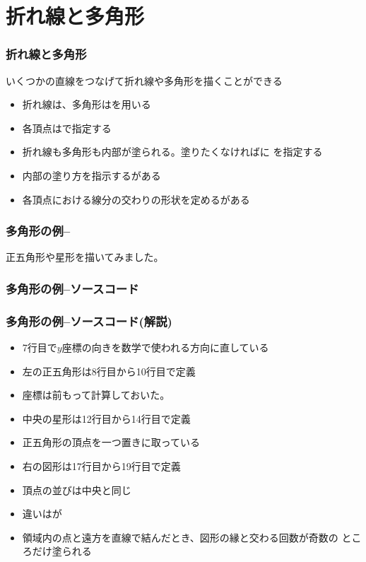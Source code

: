 

\frame{\maketitle}
\section{折れ線と多角形}
\begin{frame}[containsverbatim]
 \frametitle{折れ線と多角形}
 いくつかの直線をつなげて折れ線や多角形を描くことができる
 \begin{itemize}
  \item 折れ線は、多角形はを用いる
  \item 各頂点はで指定する
  \item 折れ線も多角形も内部が塗られる。塗りたくなければに
        を指定する
  \item 内部の塗り方を指示するがある
  \item 各頂点における線分の交わりの形状を定めるがある
 \end{itemize}
\end{frame}
\begin{frame}[containsverbatim]
 \frametitle{多角形の例--}
 正五角形や星形を描いてみました。
\end{frame}
\begin{frame}[containsverbatim]
\frametitle{多角形の例--ソースコード}
\end{frame}
\begin{frame}[containsverbatim]
 \frametitle{多角形の例--ソースコード(解説)}
 \begin{itemize}
  \item 7行目で$y$座標の向きを数学で使われる方向に直している
  \item 左の正五角形は8行目から10行目で定義
  \item 座標は前もって計算しておいた。
  \item 中央の星形は12行目から14行目で定義
  \item 正五角形の頂点を一つ置きに取っている
  \item 右の図形は17行目から19行目で定義
  \item 頂点の並びは中央と同じ
  \item 違いはが
  \item 領域内の点と遠方を直線で結んだとき、図形の縁と交わる回数が奇数の
        ところだけ塗られる
 \end{itemize}
\end{frame}
